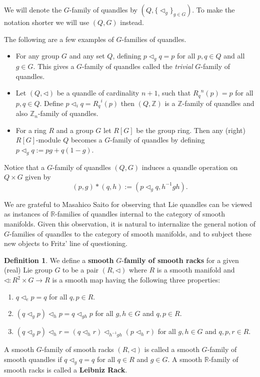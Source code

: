\documentclass[12pt]{amsart}
\theoremstyle{plain}
\theoremstyle{definition}
\newtheorem{definition}[theorem]{Definition}
\begin{document}
We will denote the $G$-family of quandles by $(Q, \{\triangleleft_g\}_{g \in G})$.  To make the notation shorter we will use $(Q,G)$ instead. 
\vspace{5mm}

The following are a few examples of $G$-families of quandles.
    \begin{itemize}
        \item 
        For any group $G$ and any set $Q$, defining $p \triangleleft_g q=p$ for all $p,q \in Q$ and all $g \in G$.  This gives a $G$-family of quandles called the \emph{trivial} $G$-family of quandles.
        
        \item
        Let $(Q, \triangleleft )$ be a quandle of cardinality $n+1$, such that ${R_q}^{n}(p)=p$ for all $p,q \in Q$.  Define $p \triangleleft_iq={R_q}^i(p)$ then  $(Q,\mathbb{Z})$ is a $\mathbb{Z}$-family of quandles and also $\mathbb{Z}_{n}$-family of quandles.

        \item 
        For a ring $R$ and a group $G$ let $R[G]$ be the group ring.  Then any (right) $R[G]$-module $Q$ becomes a $G$-family of quandles by defining $p \triangleleft_g q:=pg+q(1-g)$.
    \end{itemize}

    Notice that a $G$-family of quandles $(Q,G)$ induces a quandle operation on $Q \times G$ given by 
    \[
    (p,g)*(q,h):= (p \triangleleft_g q, h^{-1}gh). 
    \]

 We are grateful to Masahico Saito for observing that Lie quandles can be viewed as 
instances of $\mathbb{R}$-families of quandles internal to the category of smooth manifolds. Given this observation, it is natural to internalize the general notion of $G$-families of quandles to the category of smooth manifolds, and to subject these new objects to Fritz' line of questioning.

\vspace{5mm}

\begin{definition}
     We define a \textbf{smooth} $G$-\textbf{family of smooth racks} for a given (real) Lie group $G$ to be a pair $(R,\triangleleft)$ where $R$ is a smooth manifold and $\triangleleft:R^2\times G \to R$ is a smooth map having the following three properties:

\begin{enumerate}
\item 
$q\triangleleft_e p = q$ for all $q,p \in R$.
    \item 
 $ (q  \triangleleft_g p )\triangleleft_h p = q \triangleleft_{gh} p$ for all $g,h \in G$ and $q,p \in R$.

\item 
$ (q\triangleleft_g p) \triangleleft_h r = (q \triangleleft_h r)\triangleleft_{h^{-1}gh} (p\triangleleft_h r) $ for all $g,h \in G$ and $q,p,r \in R$.
\end{enumerate}
\end{definition}
A smooth $G$-family of smooth racks $(R,\triangleleft)$ is called a smooth $G$-family of smooth quandles if $q\triangleleft_g q =q$ for all $q \in R$ and $g \in G$. A smooth $\mathbb{R}$-family of smooth racks is called a \textbf{Leibniz Rack}. 
\end{document}
